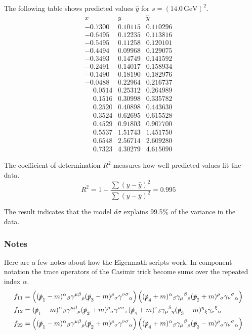 The following table shows predicted values $\hat{y}$ for $s=(14.0\,\text{GeV})^2$.
\begin{equation*}
\begin{matrix}
x & y & \hat y\\
-0.7300 & 0.10115 & 0.110296\\
-0.6495 & 0.12235 & 0.113816\\
-0.5495 & 0.11258 & 0.120101\\
-0.4494 & 0.09968 & 0.129075\\
-0.3493 & 0.14749 & 0.141592\\
-0.2491 & 0.14017 & 0.158934\\
-0.1490 & 0.18190 & 0.182976\\
-0.0488 & 0.22964 & 0.216737\\
\phantom{+}0.0514 & 0.25312 & 0.264989\\
\phantom{+}0.1516 & 0.30998 & 0.335782\\
\phantom{+}0.2520 & 0.40898 & 0.443630\\
\phantom{+}0.3524 & 0.62695 & 0.615528\\
\phantom{+}0.4529 & 0.91803 & 0.907700\\
\phantom{+}0.5537 & 1.51743 & 1.451750\\
\phantom{+}0.6548 & 2.56714 & 2.609280\\
\phantom{+}0.7323 & 4.30279 & 4.615090
\end{matrix}
\end{equation*}

The coefficient of determination $R^2$ measures how well predicted values fit the data.
\begin{equation*}
R^2=1-\frac{\sum(y-\hat{y})^2}{\sum(y-\bar{y})^2}=0.995
\end{equation*}

The result indicates that the model $d\sigma$ explains 99.5\% of the variance in the data.

\subsubsection*{Notes}
Here are a few notes about how the Eigenmath scripts work.
In component notation the trace operators of the Casimir trick become sums over the repeated index $\alpha$.
\begin{align*}
f_{11}&=
\left(
(\slashed{p}_1-m)^\alpha{}_\beta
\gamma^{\mu\beta}{}_\rho
(\slashed{p}_3-m)^\rho{}_\sigma
\gamma^{\nu\sigma}{}_\alpha
\right)
\left(
(\slashed{p}_4+m)^\alpha{}_\beta
\gamma_\mu{}^\beta{}_\rho
(\slashed{p}_2+m)^\rho{}_\sigma
\gamma_\nu{}^\sigma{}_\alpha
\right)
\\
f_{12}&=
(\slashed{p}_1-m)^\alpha{}_\beta
\gamma^{\mu\beta}{}_\rho
(\slashed{p}_2+m)^\rho{}_\sigma
\gamma^{\nu\sigma}{}_\tau
(\slashed{p}_4+m)^\tau{}_\delta
\gamma_\mu{}^\delta{}_\eta
(\slashed{p}_3-m)^\eta{}_\xi
\gamma_\nu{}^\xi{}_\alpha
\\
f_{22}&=
\left(
(\slashed{p}_1-m)^\alpha{}_\beta
\gamma^{\mu\beta}{}_\rho
(\slashed{p}_2+m)^\rho{}_\sigma
\gamma^{\nu\sigma}{}_\alpha
\right)
\left(
(\slashed{p}_4+m)^\alpha{}_\beta
\gamma_\mu{}^\beta{}_\rho
(\slashed{p}_3-m)^\rho{}_\sigma
\gamma_\nu{}^\sigma{}_\alpha
\right)
\end{align*}

